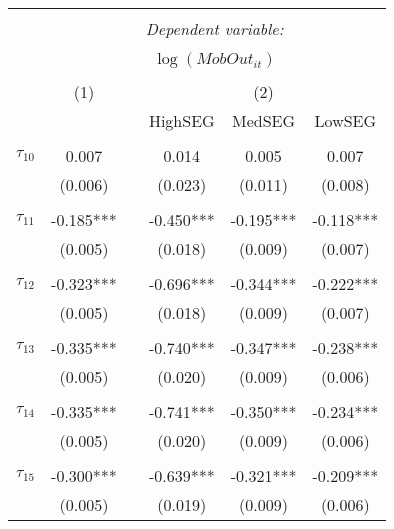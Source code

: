 \begin{tabular}{@{\extracolsep{-5pt}}lccccc} 
\\[-1.8ex]\hline 
\hline \\[-1.8ex] 
 & \multicolumn{5}{c}{\textit{Dependent variable:}} \\ 
\cline{2-6} 
\\[-1.8ex] & \multicolumn{5}{c}{$\log(MobOut_{it})$}\\ 
\\[-1.8ex] & (1) && \multicolumn{3}{c}{(2)} \\ 
\cline{2-2}\cline{4-6}
        &&& HighSEG & MedSEG & LowSEG  \\
 \\[-1.8ex] 
$\tau_{10}$     &   0.007   &&   0.014   &   0.005   &   0.007   \\
                &  (0.006)  &&  (0.023)  &  (0.011)  &  (0.008)  \\
                &           &&           &           &           \\[-2.1ex]
$\tau_{11}$     & -0.185*** && -0.450*** & -0.195*** & -0.118*** \\
                &  (0.005)  &&  (0.018)  &  (0.009)  &  (0.007)  \\
                &           &&           &           &           \\[-2.1ex]
$\tau_{12}$     & -0.323*** && -0.696*** & -0.344*** & -0.222*** \\
                &  (0.005)  &&  (0.018)  &  (0.009)  &  (0.007)  \\
                &           &&           &           &           \\[-2.1ex]
$\tau_{13}$     & -0.335*** && -0.740*** & -0.347*** & -0.238*** \\
                &  (0.005)  &&  (0.020)  &  (0.009)  &  (0.006)  \\
                &           &&           &           &           \\[-2.1ex]
$\tau_{14}$     & -0.335*** && -0.741*** & -0.350*** & -0.234*** \\
                &  (0.005)  &&  (0.020)  &  (0.009)  &  (0.006)  \\
                &           &&           &           &           \\[-2.1ex]
$\tau_{15}$     & -0.300*** && -0.639*** & -0.321*** & -0.209*** \\
                &  (0.005)  &&  (0.019)  &  (0.009)  &  (0.006)  \\

\end{tabular}
